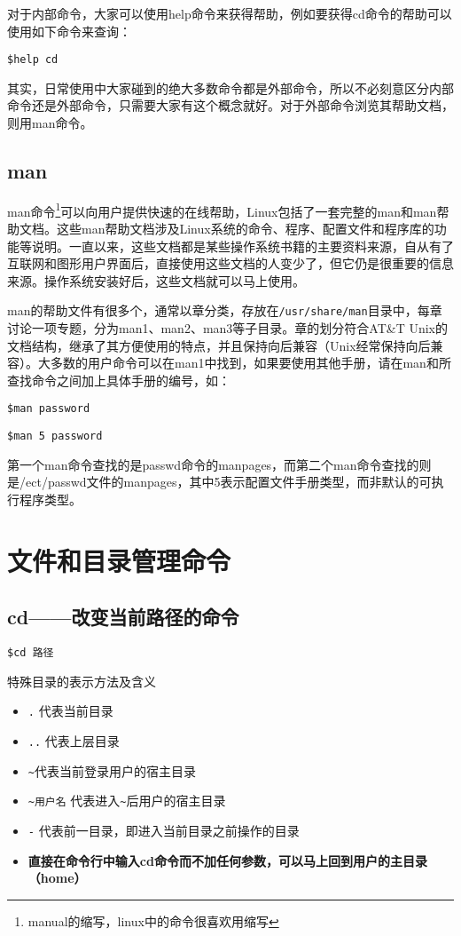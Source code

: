 对于内部命令，大家可以使用help命令来获得帮助，例如要获得cd命令的帮助可以使用如下命令来查询：

\verb*|$help cd|

其实，日常使用中大家碰到的绝大多数命令都是外部命令，所以不必刻意区分内部命令还是外部命令，只需要大家有这个概念就好。对于外部命令浏览其帮助文档，则用man命令。


\subsection{man}
man命令\footnote{manual的缩写，linux中的命令很喜欢用缩写}可以向用户提供快速的在线帮助，Linux包括了一套完整的man和man帮助文档。这些man帮助文档涉及Linux系统的命令、程序、配置文件和程序库的功能等说明。一直以来，这些文档都是某些操作系统书籍的主要资料来源，自从有了互联网和图形用户界面后，直接使用这些文档的人变少了，但它仍是很重要的信息来源。操作系统安装好后，这些文档就可以马上使用。

man的帮助文件有很多个，通常以章分类，存放在\verb|/usr/share/man|目录中，每章讨论一项专题，分为man1、man2、man3等子目录。章的划分符合AT\&T Unix的文档结构，继承了其方便使用的特点，并且保持向后兼容（Unix经常保持向后兼容）。大多数的用户命令可以在man1中找到，如果要使用其他手册，请在man和所查找命令之间加上具体手册的编号，如：

\verb*|$man password|

\verb*|$man 5 password|

第一个man命令查找的是passwd命令的manpages，而第二个man命令查找的则是/ect/passwd文件的manpages，其中5表示配置文件手册类型，而非默认的可执行程序类型。


\section{文件和目录管理命令}
\subsection{cd——改变当前路径的命令}
\verb*|$cd 路径|

特殊目录的表示方法及含义
\begin{itemize}
\item \verb|.| 代表当前目录
\item \verb|..| 代表上层目录
\item \verb|~|代表当前登录用户的宿主目录
\item \verb|~用户名| 代表进入\verb|~|后用户的宿主目录
\item \verb|-| 代表前一目录，即进入当前目录之前操作的目录
\item \textbf{直接在命令行中输入cd命令而不加任何参数，可以马上回到用户的主目录（home）}
\end{itemize}


